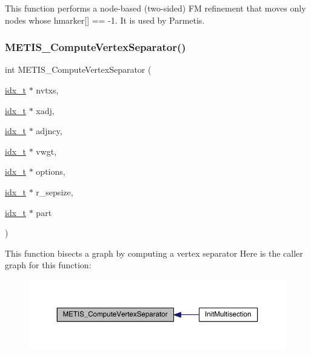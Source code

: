 This function performs a node-\/based (two-\/sided) FM refinement that moves only nodes whose hmarker\mbox{[}\mbox{]} == -\/1. It is used by Parmetis. \mbox{\label{a00939_ace6bcd6bf97b8579b1deed389874ddc6}} 
\subsubsection{\texorpdfstring{M\+E\+T\+I\+S\+\_\+\+Compute\+Vertex\+Separator()}{METIS\_ComputeVertexSeparator()}}
{\footnotesize\ttfamily int M\+E\+T\+I\+S\+\_\+\+Compute\+Vertex\+Separator (\begin{DoxyParamCaption}\item[{\hyperlink{a00876_aaa5262be3e700770163401acb0150f52}{idx\+\_\+t} $\ast$}]{nvtxs,  }\item[{\hyperlink{a00876_aaa5262be3e700770163401acb0150f52}{idx\+\_\+t} $\ast$}]{xadj,  }\item[{\hyperlink{a00876_aaa5262be3e700770163401acb0150f52}{idx\+\_\+t} $\ast$}]{adjncy,  }\item[{\hyperlink{a00876_aaa5262be3e700770163401acb0150f52}{idx\+\_\+t} $\ast$}]{vwgt,  }\item[{\hyperlink{a00876_aaa5262be3e700770163401acb0150f52}{idx\+\_\+t} $\ast$}]{options,  }\item[{\hyperlink{a00876_aaa5262be3e700770163401acb0150f52}{idx\+\_\+t} $\ast$}]{r\+\_\+sepsize,  }\item[{\hyperlink{a00876_aaa5262be3e700770163401acb0150f52}{idx\+\_\+t} $\ast$}]{part }\end{DoxyParamCaption})}

This function bisects a graph by computing a vertex separator Here is the caller graph for this function\+:\nopagebreak
\begin{figure}[H]
\begin{center}
\leavevmode
\includegraphics[width=350pt]{a00939_ace6bcd6bf97b8579b1deed389874ddc6_icgraph}
\end{center}
\end{figure}
\mbox{\label{a00939_a6cb045354f114552086ac2f3ce8d3586}} 
